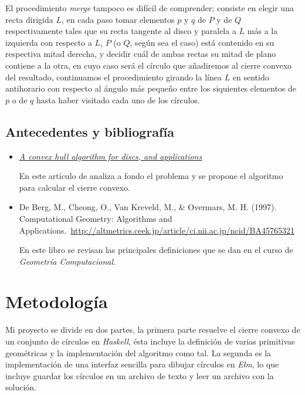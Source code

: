 \documentclass[12pt]{article}
\begin{document}
El procedimiento \textit{merge} tampoco es difícil de comprender; consiste en elegir una recta dirigida $L$, en cada paso tomar elementos $p$ y $q$ de $P$ y de $Q$ respectivamente tales que su recta tangente al disco y paralela a $L$ más a la izquierda con respecto a $L$, $P$ (o $Q$, según sea el caso) está contenido en su respectiva mitad derecha, y decidir cuál de ambas rectas su mitad de plano contiene a la otra, en cuyo caso será el círculo que añadiremos al cierre convexo del resultado, continuamos el procedimiento girando la línea $L$ en sentido antihorario con respecto al ángulo más pequeño entre los siquientes elementos de $p$ o de $q$ hasta haber visitado cada uno de los círculos.

\subsection*{Antecedentes y bibliografía}

\begin{itemize}
\item \href{https://www.sciencedirect.com/science/article/pii/092577219290015K}{\textit{A convex hull algorithm for discs, and applications}}

  En este artículo de analiza a fondo el problema y se propone el algoritmo para calcular el cierre convexo.

\item De Berg, M., Cheong, O., Van Kreveld, M., \& Overmars, M. H. (1997). Computational Geometry: Algorithms and Applications.\ \href{http://altmetrics.ceek.jp/article/ci.nii.ac.jp/ncid/BA45765321}{http://altmetrics.ceek.jp/article/ci.nii.ac.jp/ncid/BA45765321}

  En este libro se revisan las principales definiciones que se dan en el curso de \textit{Geometría Computacional}.
  
\end{itemize}

\newpage

\section*{Metodología}

\noindent Mi proyecto se divide en dos partes, la primera parte resuelve el cierre convexo de un conjunto de círculos en \textit{Haskell}, ésta incluye la definición de varias primitivas geométricas y la implementación del algoritmo como tal. La segunda es la implementación de una interfaz sencilla para dibujar círculos  en \textit{Elm}, lo que incluye guardar los círculos en un archivo de texto y leer un archivo con la solución.
\end{document}
